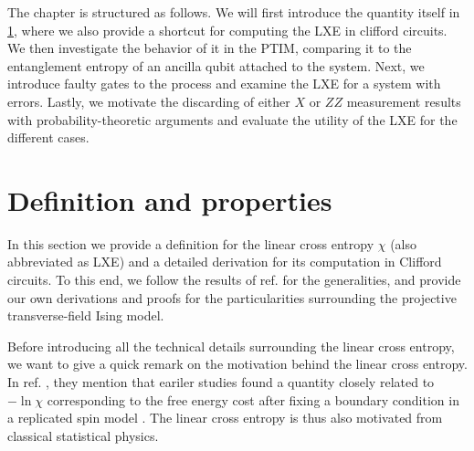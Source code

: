 
The chapter is structured as follows. We will first introduce the quantity
itself in \cref{sec:lxe-defn}, where we also provide a shortcut for computing
the LXE in clifford circuits. We then investigate the behavior of it in the
PTIM, comparing it to the entanglement entropy of an ancilla qubit attached to
the system. Next, we introduce faulty gates to the process and examine the LXE
for a system with errors. Lastly, we motivate the discarding of either $X$ or
$ZZ$ measurement results with probability-theoretic arguments and evaluate the
utility of the LXE for the different cases.
\newpage
\section{Definition and properties}\label{sec:lxe-defn}
In this section we provide a definition for the linear cross entropy $\chi$
(also abbreviated as LXE)
and a detailed derivation for its computation in Clifford circuits. To this
end, we follow the results of ref.
\cite{liCrossEntropyBenchmark2023,tikhanovskayaUniversalityCrossEntropy2023} for the
generalities, and provide our own derivations and proofs for the
particularities surrounding the projective transverse-field Ising model.

Before introducing all the technical details surrounding the linear cross
entropy, we want to give a quick remark on the motivation behind the linear
cross entropy. In ref.
\cite{liCrossEntropyBenchmark2023}, they mention that eariler studies found a
quantity closely related to $-\ln\chi$ corresponding to the free energy cost
after fixing a boundary condition in a replicated spin model
\cite{liCrossEntropyBenchmark2023,baoTheoryPhaseTransition2020,jianMeasurementinducedCriticalityRandom2020,nahumOperatorSpreadingRandom2018,zhouEmergentStatisticalMechanics2019}.
The linear cross entropy is thus also motivated from classical statistical physics.

